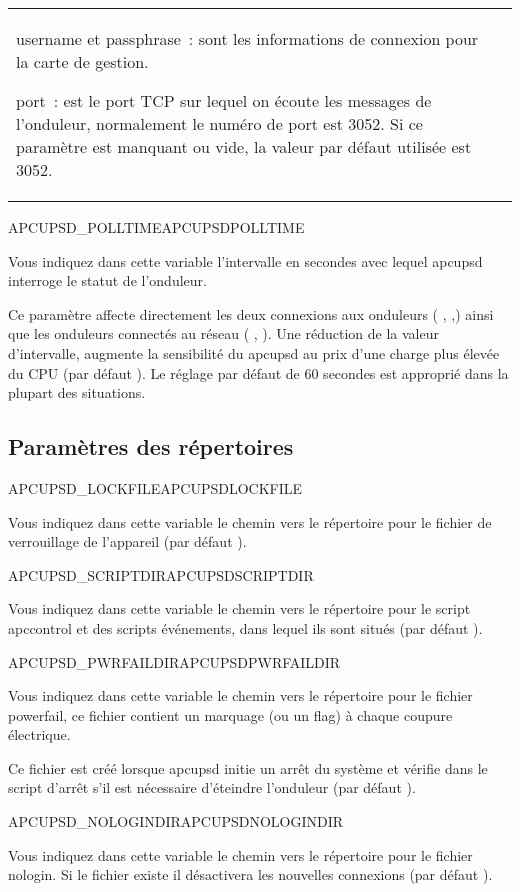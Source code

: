 \begin{description}
\begin{tabular}{p{20mm}p{120mm}}
  username et passphrase~: sont les informations de connexion pour la carte
  de gestion.

  port~: est le port TCP sur lequel on écoute les messages de l'onduleur,
  normalement le numéro de port est 3052. Si ce paramètre est manquant
  ou vide, la valeur par défaut utilisée est 3052.
  \\
\end{tabular}


 {APCUPSD\_POLLTIME}{APCUPSDPOLLTIME}

  Vous indiquez dans cette variable l'intervalle en secondes avec lequel
  apcupsd interroge le statut de l'onduleur.

  Ce paramètre affecte directement les deux connexions aux onduleurs
  ( , ,) 
  ainsi que les onduleurs connectés au réseau ( 
  , ).
  Une réduction de la valeur d'intervalle, augmente la sensibilité du apcupsd au prix
  d'une charge plus élevée du CPU (par défaut ).
  Le réglage par défaut de 60 secondes est approprié dans la plupart des situations.

\end {description}

\subsection{Paramètres des répertoires}
\begin {description}

 {APCUPSD\_LOCKFILE}{APCUPSDLOCKFILE}

  Vous indiquez dans cette variable le chemin vers le répertoire pour le fichier
  de verrouillage de l'appareil (par défaut ).


 {APCUPSD\_SCRIPTDIR}{APCUPSDSCRIPTDIR}

  Vous indiquez dans cette variable le chemin vers le répertoire pour le script
  apccontrol et des scripts événements, dans lequel ils sont situés
  (par défaut ).


 {APCUPSD\_PWRFAILDIR}{APCUPSDPWRFAILDIR}

  Vous indiquez dans cette variable le chemin vers le répertoire pour le fichier
  powerfail, ce fichier contient un marquage (ou un flag) à chaque coupure électrique.

  Ce fichier est créé lorsque apcupsd initie un arrêt du système et vérifie
  dans le script d'arrêt s'il est nécessaire d'éteindre l'onduleur
  (par défaut ).


 {APCUPSD\_NOLOGINDIR}{APCUPSDNOLOGINDIR}

  Vous indiquez dans cette variable le chemin vers le répertoire pour le fichier
  nologin. Si le fichier existe il désactivera les nouvelles connexions
  (par défaut ).

\end {description}

